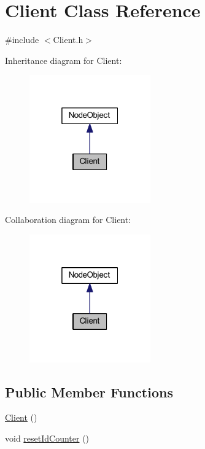 \hypertarget{class_client}{}\section{Client Class Reference}
\label{class_client}


{\ttfamily \#include $<$Client.\+h$>$}



Inheritance diagram for Client\+:
\nopagebreak
\begin{figure}[H]
\begin{center}
\leavevmode
\includegraphics[width=148pt]{class_client__inherit__graph}
\end{center}
\end{figure}


Collaboration diagram for Client\+:
\nopagebreak
\begin{figure}[H]
\begin{center}
\leavevmode
\includegraphics[width=148pt]{class_client__coll__graph}
\end{center}
\end{figure}
\subsection*{Public Member Functions}
\begin{DoxyCompactItemize}
\item 
\hyperlink{class_client_ae51af7aa6b8f591496a8f6a4a87a14bf}{Client} ()
\item 
void \hyperlink{class_client_acf31317770c47dc7087dceffe5663b73}{reset\+Id\+Counter} ()
\end{DoxyCompactItemize}
